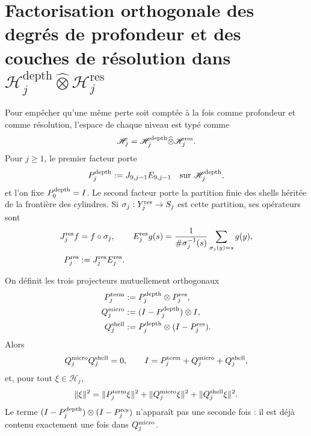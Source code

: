 \section{Factorisation orthogonale des degrés de profondeur et des couches de résolution dans \(\mathscr H_j^{\mathrm{depth}}\widehat\otimes\mathscr H_j^{\mathrm{res}}\)}
\label{sec:pdfv2-sol-micro-shell}

Pour empêcher qu'une même perte soit comptée à la fois comme profondeur et
comme résolution, l'espace de chaque niveau est typé comme
\begin{equation}\label{eq:pdfv2-sol-factor-hilbert}
 \mathscr H_j
 =\mathscr H_j^{\rm depth}\widehat\otimes
  \mathscr H_j^{\rm res}.
\end{equation}
Pour \(j\geq1\), le premier facteur porte
\[
 P_j^{\rm depth}:=J_{9,j-1}E_{9,j-1}
 \quad\text{sur }\mathscr H_j^{\rm depth},
\]
et l'on fixe \(P_0^{\rm depth}=I\). Le second facteur porte la partition
finie des shells héritée de la frontière des cylindres. Si
\(\sigma_j:Y_j^{\rm res}\to S_j\) est cette partition, ses opérateurs sont
\begin{align}
 J_j^{\rm res}f&=f\circ\sigma_j,
 &E_j^{\rm res}g(s)&=
 \frac1{\#\sigma_j^{-1}(s)}
 \sum_{\sigma_j(y)=s}g(y),
 \label{eq:pdfv2-sol-shell-je}\\
 P_j^{\rm res}&:=J_j^{\rm res}E_j^{\rm res}.
 \label{eq:pdfv2-sol-shell-p}
\end{align}

On définit les trois projecteurs mutuellement orthogonaux
\begin{align}
 P_j^{\rm term}
 &:=P_j^{\rm depth}\otimes P_j^{\rm res},
 \label{eq:pdfv2-sol-pterm}\\
 Q_j^{\rm micro}
 &:=(I-P_j^{\rm depth})\otimes I,
 \label{eq:pdfv2-sol-qmicro}\\
 Q_j^{\rm shell}
 &:=P_j^{\rm depth}\otimes(I-P_j^{\rm res}).
 \label{eq:pdfv2-sol-qshell}
\end{align}
Alors
\begin{equation}\label{eq:pdfv2-sol-ortogonalidad}
 Q_j^{\rm micro}Q_j^{\rm shell}=0,
 \qquad
 I=P_j^{\rm term}+Q_j^{\rm micro}+Q_j^{\rm shell},
\end{equation}
et, pour tout \(\xi\in\mathscr H_j\),
\begin{equation}\label{eq:pdfv2-sol-pitagoras}
 \|\xi\|^2
 =\|P_j^{\rm term}\xi\|^2
  +\|Q_j^{\rm micro}\xi\|^2
  +\|Q_j^{\rm shell}\xi\|^2.
\end{equation}
Le terme
\((I-P_j^{\rm depth})\otimes(I-P_j^{\rm res})\) n'apparaît pas une seconde fois : il est déjà
contenu exactement une fois dans \(Q_j^{\rm micro}\).

